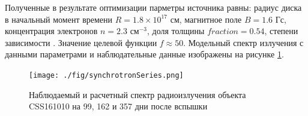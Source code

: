 Полученные в результате оптимизации парметры источника равны: радиус диска в начальный момент времени $R = 1.8\times10^17 \text{ см}$, магнитное поле $B = 1.6 \text{ Гс}$, концентрация электронов $n = 2.3 \text{ см}^{-3}$, доля толщины $fraction = 0.54 $, степени зависимости . Значение целевой функции $f \approx 50$. Модельный спектр излучения  с данными параметрами и наблюдательные данные изображены на рисунке \ref{synchrotronSeries}.

\begin{figure}
	\centering
	\texttt{[image: ./fig/synchrotronSeries.png]} 
	\caption{Наблюдаемый и расчетный спектр радиоизлучения объекта CSS161010 на 99, 162 и 357 дни после вспышки}
	\label{synchrotronSeries}
\end{figure}